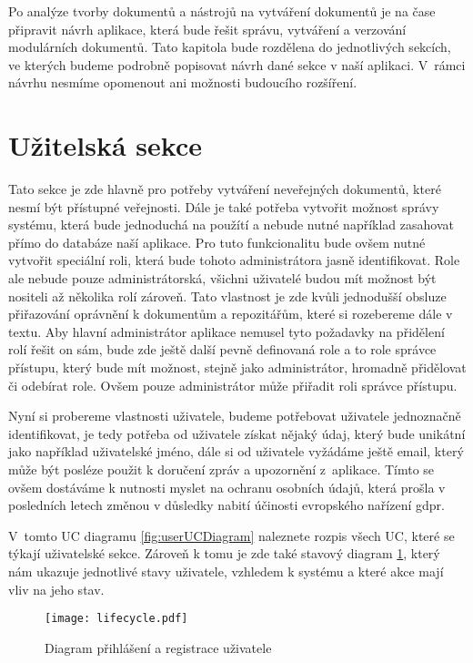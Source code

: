 Po analýze tvorby dokumentů a nástrojů na vytváření dokumentů je na čase připravit návrh aplikace, která bude řešit správu, vytváření a verzování
modulárních dokumentů. Tato kapitola bude rozdělena do jednotlivých sekcích, ve kterých budeme podrobně popisovat návrh dané sekce v naší aplikaci.
V~rámci návrhu nesmíme opomenout ani možnosti budoucího rozšíření.

\section{Užitelská sekce}

Tato sekce je zde hlavně pro potřeby vytváření neveřejných dokumentů, které nesmí být přístupné veřejnosti. Dále je také potřeba vytvořit možnost
správy systému, která bude jednoduchá na použítí a nebude nutné například zasahovat přímo do databáze naší aplikace. Pro tuto funkcionalitu bude ovšem
nutné vytvořit speciální roli, která bude tohoto administrátora jasně identifikovat. Role ale nebude pouze administrátorská, všichni uživatelé budou mít
možnost být nositeli až několika rolí zároveň. Tato vlastnost je zde kvůli jednodušší obsluze přiřazování oprávnění k dokumentům a repozitářům, které si rozebereme
dále v textu. Aby hlavní administrátor aplikace nemusel tyto požadavky na přidělení rolí řešit on sám, bude zde ještě další pevně definovaná role a to role
správce přístupu, který bude mít možnost, stejně jako administrátor, hromadně přidělovat či odebírat role. Ovšem pouze administrátor může přiřadit roli správce přístupu.

Nyní si probereme vlastnosti uživatele, budeme potřebovat uživatele jednoznačně identifikovat, je tedy potřeba od uživatele získat nějaký údaj, který bude unikátní
jako například uživatelské jméno, dále si od uživatele vyžádáme ještě email, který může být posléze použit k doručení zpráv a upozornění z~aplikace. Tímto se ovšem
dostáváme k nutnosti myslet na ochranu osobních údajů, která prošla v posledních letech změnou v důsledky nabití účinosti evropského nařízení \gls{gdpr}.

V~tomto UC diagramu \ref{fig:userUCDiagram} naleznete rozpis všech UC, které se týkají uživatelské sekce. Zároveň k tomu je zde také stavový diagram \ref{fig:userFlow},
který nám ukazuje jednotlivé stavy uživatele, vzhledem k systému a které akce mají vliv na jeho stav.

\begin{figure}[H]
    \centering
    \texttt{[image: lifecycle.pdf]}
    \caption{Diagram přihlášení a registrace uživatele}
    \label{fig:userFlow}
\end{figure}

